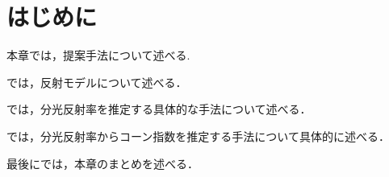 \documentclass[../main]{subfiles}
\begin{document}
\graphicspath{{../figures/chap3/}}

\section{はじめに}
\label{sec:pmethod_introduction}

本章では，提案手法について述べる.

では，反射モデルについて述べる．

では，分光反射率を推定する具体的な手法について述べる．

では，分光反射率からコーン指数を推定する手法について具体的に述べる．

最後にでは，本章のまとめを述べる．
\end{document}
